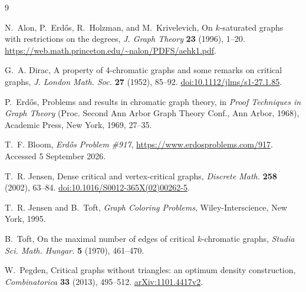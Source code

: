 \documentclass[11pt]{article}
\numberwithin{equation}{section}
\begin{document}
\begin{thebibliography}{9}

N.~Alon, P.~Erd\H{o}s, R.~Holzman, and M.~Krivelevich,
On \(k\)-saturated graphs with restrictions on the degrees,
\emph{J. Graph Theory} \textbf{23} (1996), 1--20.
\url{https://web.math.princeton.edu/~nalon/PDFS/aehk1.pdf}.

G.~A. Dirac,
A property of 4-chromatic graphs and some remarks on critical graphs,
\emph{J. London Math. Soc.} \textbf{27} (1952), 85--92.
\href{https://doi.org/10.1112/jlms/s1-27.1.85}{doi:10.1112/jlms/s1-27.1.85}.

P.~Erd\H{o}s,
Problems and results in chromatic graph theory,
in \emph{Proof Techniques in Graph Theory}
(Proc. Second Ann Arbor Graph Theory Conf., Ann Arbor, 1968),
Academic Press, New York, 1969, 27--35.

T.~F. Bloom,
\emph{Erd\H{o}s Problem \#917},
\url{https://www.erdosproblems.com/917}.
Accessed 5 September 2026.

T.~R. Jensen,
Dense critical and vertex-critical graphs,
\emph{Discrete Math.} \textbf{258} (2002), 63--84.
\href{https://doi.org/10.1016/S0012-365X(02)00262-5}{doi:10.1016/S0012-365X(02)00262-5}.

T.~R. Jensen and B.~Toft,
\emph{Graph Coloring Problems},
Wiley-Interscience, New York, 1995.

B.~Toft,
On the maximal number of edges of critical \(k\)-chromatic graphs,
\emph{Studia Sci. Math. Hungar.} \textbf{5} (1970), 461--470.

W.~Pegden,
Critical graphs without triangles: an optimum density construction,
\emph{Combinatorica} \textbf{33} (2013), 495--512.
\href{https://arxiv.org/abs/1101.4417v2}{arXiv:1101.4417v2}.

\end{thebibliography}
\end{document}
